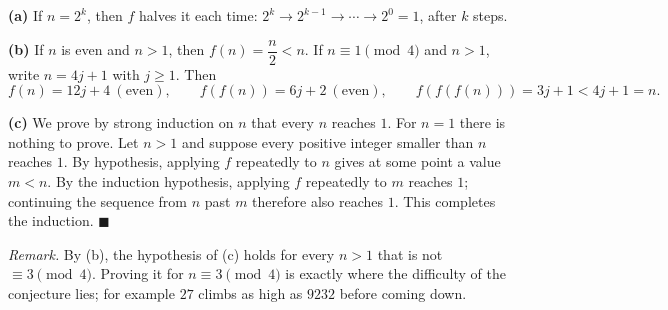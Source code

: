 \textbf{(a)} If $n=2^k$, then $f$ halves it each time: $2^k\to2^{k-1}\to\cdots\to2^0=1$, after $k$ steps.

\textbf{(b)} If $n$ is even and $n>1$, then $f(n)=\dfrac n2<n$. If $n\equiv1\pmod4$ and $n>1$, write $n=4j+1$ with $j\ge1$. Then
\[f(n)=12j+4\ (\text{even}),\qquad f(f(n))=6j+2\ (\text{even}),\qquad f(f(f(n)))=3j+1<4j+1=n.\]

\textbf{(c)} We prove by strong induction on $n$ that every $n$ reaches $1$. For $n=1$ there is nothing to prove. Let $n>1$ and suppose every positive integer smaller than $n$ reaches $1$. By hypothesis, applying $f$ repeatedly to $n$ gives at some point a value $m<n$. By the induction hypothesis, applying $f$ repeatedly to $m$ reaches $1$; continuing the sequence from $n$ past $m$ therefore also reaches $1$. This completes the induction. $\blacksquare$

\emph{Remark.} By (b), the hypothesis of (c) holds for every $n>1$ that is not $\equiv3\pmod4$. Proving it for $n\equiv3\pmod4$ is exactly where the difficulty of the conjecture lies; for example $27$ climbs as high as $9232$ before coming down.
